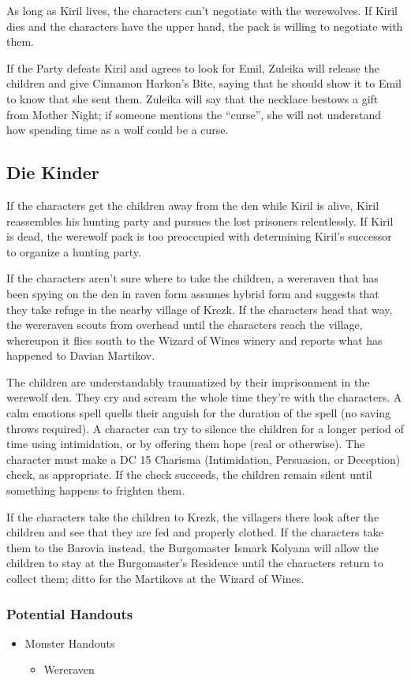\documentclass[a4paper,11pt]{article}
\begin{document}
As long as Kiril lives, the characters can't negotiate with the werewolves. If Kiril dies and the characters have 
the upper hand, the pack is willing to negotiate with them.

If the Party defeats Kiril and agrees to look for Emil, Zuleika will release the children and give Cinnamon 
Harkon's Bite, saying that he should show it to Emil to know that she sent them. Zuleika will say that the necklace 
bestows a gift from Mother Night; if someone mentions the ``curse'', she will not understand how spending time as a
wolf could be a curse.

\subsection{Die Kinder}
If the characters get the children away from the den while Kiril is alive, Kiril reassembles his hunting party and 
pursues the lost prisoners relentlessly. If Kiril is dead, the werewolf pack is too preoccupied with determining 
Kiril's successor to organize a hunting party.

If the characters aren't sure where to take the children, a wereraven that has been spying on the den in raven form 
assumes hybrid form and suggests that they take refuge in the nearby village of Krezk. If the characters head that 
way, the wereraven scouts from overhead until the characters reach the village, whereupon it flies south to the 
Wizard of Wines winery and reports what has happened to Davian Martikov.

The children are understandably traumatized by their imprisonment in the werewolf den. They cry and scream the 
whole time they're with the characters. A calm emotions spell quells their anguish for the duration of the spell 
(no saving throws required). A character can try to silence the children for a longer period of time using 
intimidation, or by offering them hope (real or otherwise). The character must make a DC 15 Charisma (Intimidation, 
Persuasion, or Deception) check, as appropriate. If the check succeeds, the children remain silent until something 
happens to frighten them.

If the characters take the children to Krezk, the villagers there look after the children and see that they are fed 
and properly clothed. If the characters take them to the Barovia instead, the Burgomaster Ismark Kolyana will allow 
the children to stay at the Burgomaster's Residence until the characters return to collect them; ditto for the 
Martikovs at the Wizard of Wines.
\subsubsection{Potential Handouts}
\begin{itemize}
  \item Monster Handouts
  \begin{itemize}
    \item Wereraven
  \end{itemize}
\end{itemize}
\end{document}

